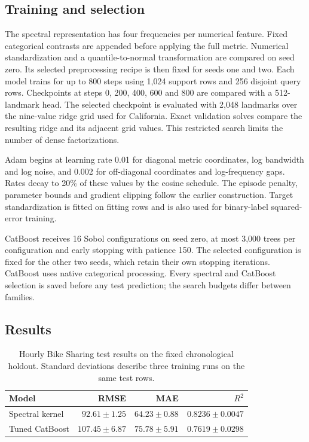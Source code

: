 \subsection{Training and selection}

The spectral representation has four frequencies per numerical feature. Fixed categorical contrasts are appended before applying the full metric. Numerical standardization and a quantile-to-normal transformation are compared on seed zero. Its selected preprocessing recipe is then fixed for seeds one and two. Each model trains for up to 800 steps using 1,024 support rows and 256 disjoint query rows. Checkpoints at steps 0, 200, 400, 600 and 800 are compared with a 512-landmark head. The selected checkpoint is evaluated with 2,048 landmarks over the nine-value ridge grid used for California. Exact validation solves compare the resulting ridge and its adjacent grid values. This restricted search limits the number of dense factorizations.

Adam begins at learning rate 0.01 for diagonal metric coordinates, log bandwidth and log noise, and 0.002 for off-diagonal coordinates and log-frequency gaps. Rates decay to 20\% of these values by the cosine schedule. The episode penalty, parameter bounds and gradient clipping follow the earlier construction. Target standardization is fitted on fitting rows and is also used for binary-label squared-error training.

CatBoost receives 16 Sobol configurations on seed zero, at most 3,000 trees per configuration and early stopping with patience 150. The selected configuration is fixed for the other two seeds, which retain their own stopping iterations. CatBoost uses native categorical processing. Every spectral and CatBoost selection is saved before any test prediction; the search budgets differ between families.

\subsection{Results}

\begin{table}[htbp]\centering\small

\caption{Hourly Bike Sharing test results on the fixed chronological holdout. Standard deviations describe three training runs on the same test rows.}\label{tab:bike}

\begin{tabular}{lrrr}\toprule Model & RMSE & MAE & $R^2$\\\midrule

Spectral kernel & $92.61\pm1.25$ & $64.23\pm0.88$ & $0.8236\pm0.0047$\\

Tuned CatBoost & $107.45\pm6.87$ & $75.78\pm5.91$ & $0.7619\pm0.0298$\\

\bottomrule\end{tabular}\end{table}

